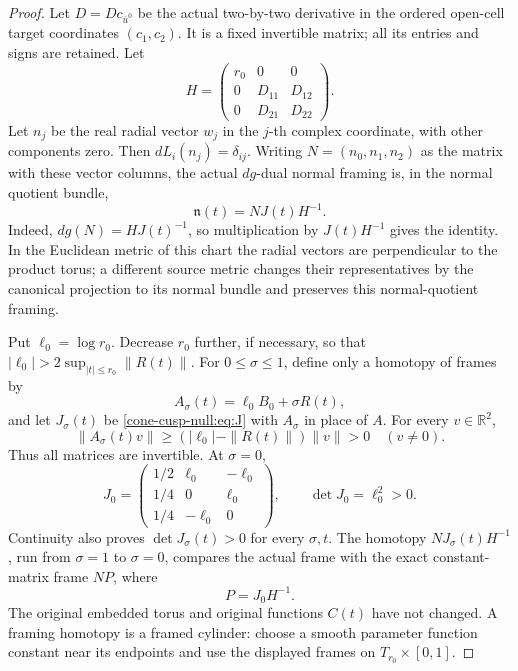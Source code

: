 \documentclass[11pt,letterpaper]{article}
\numberwithin{equation}{section}
\theoremstyle{definition}
\theoremstyle{remark}
\begin{document}
\begin{proof}
Let \(D=Dc_{\overline u^0}\) be the actual two-by-two derivative in
the ordered open-cell target coordinates \((c_1,c_2)\). It is a fixed
invertible matrix; all its entries and signs are retained. Let
\[
 H=\begin{pmatrix}r_0&0&0\\0&D_{11}&D_{12}\\0&D_{21}&D_{22}\end{pmatrix}.
\]
Let \(n_j\) be the real radial vector \(w_j\) in the \(j\)-th complex
coordinate, with other components zero. Then \(dL_i(n_j)=\delta_{ij}\).
Writing \(N=(n_0,n_1,n_2)\) as the matrix with these vector columns, the actual
\(dg\)-dual normal framing is, in the normal quotient bundle,
\begin{equation}
 \mathfrak n(t)=N J(t)H^{-1}.
 \label{cone-cusp-null:eq:actual-frame}
\end{equation}
Indeed, \(dg(N)=HJ(t)^{-1}\), so multiplication by \(J(t)H^{-1}\)
gives the identity. In the Euclidean metric of this chart the radial
vectors are perpendicular to the product torus; a different source
metric changes their representatives by the canonical projection to its
normal bundle and preserves this normal-quotient framing.

Put \(\ell_0=\log r_0\). Decrease \(r_0\) further, if necessary, so
that \(|\ell_0|>2\sup_{|t|\leq r_0}\|R(t)\|\). For
\(0\leq\sigma\leq1\), define only a homotopy of frames by
\[
 A_\sigma(t)=\ell_0B_0+\sigma R(t),
\]
and let \(J_\sigma(t)\) be \eqref{cone-cusp-null:eq:J} with \(A_\sigma\) in place
of \(A\). For every \(v\in\mathbb R^2\),
\[
 \|A_\sigma(t)v\|\geq
 (|\ell_0|-\|R(t)\|)\|v\|>0\quad(v\ne0).
\]
Thus all matrices are invertible. At \(\sigma=0\),
\begin{equation}
 J_0=
 \begin{pmatrix}
 1/2&\ell_0&-\ell_0\\
 1/4&0&\ell_0\\
 1/4&-\ell_0&0
 \end{pmatrix},\qquad \det J_0=\ell_0^2>0.
 \label{cone-cusp-null:eq:J0}
\end{equation}
Continuity also proves \(\det J_\sigma(t)>0\) for every \(\sigma,t\).
The homotopy \(N J_\sigma(t)H^{-1}\), run from \(\sigma=1\) to
\(\sigma=0\), compares the actual frame with the exact constant-matrix
frame \(N P\), where
\begin{equation}
 P=J_0H^{-1}.
 \label{cone-cusp-null:eq:P}
\end{equation}
The original embedded torus and original functions \(C(t)\) have not
changed. A framing homotopy is a framed cylinder: choose a smooth
parameter function constant near its endpoints and use the displayed
frames on \(T_{r_0}\times[0,1]\).


\end{proof}
\end{document}
